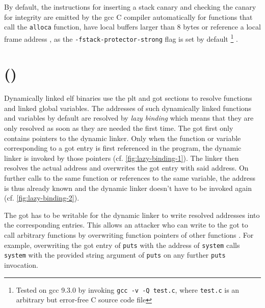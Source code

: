 By default, the instructions for inserting a stack canary and checking the canary for integrity are emitted by the \gls{gcc} C compiler automatically for functions that call the \texttt{alloca} function, have local buffers larger than 8 bytes or reference a local frame address \cite{FSF2019}, as the \texttt{-fstack-protector-strong} flag is set by default%
	\footnote{Tested on \gls{gcc} 9.3.0 by invoking \texttt{gcc -v -Q test.c}, where \texttt{test.c} is an arbitrary but error-free C source code file}%
.

\section{ ()}
\label{sec:relro}

Dynamically linked \gls{elf} binaries use the \gls{plt} and \gls{got} sections to resolve functions and linked global variables.
The addresses of such dynamically linked functions and variables by default are resolved by \emph{lazy binding} which means that they are only resolved as soon as they are needed the first time.
The \gls{got} first only contains pointers to the dynamic linker.
Only when the function or variable corresponding to a \gls{got} entry is first referenced in the program, the dynamic linker is invoked by those pointers (cf. \cref{fig:lazy-binding-1}).
The linker then resolves the actual address and overwrites the \gls{got} entry with said address.
On further calls to the same function or references to the same variable, the address is thus already known and the dynamic linker doesn't have to be invoked again \cites{Bendersky2011}[645\psqq]{Federico2015}{Sidhpurwala2019} (cf. \cref{fig:lazy-binding-2}).

The \gls{got} has to be writable for the dynamic linker to write resolved addresses into the corresponding entries.
This allows an attacker who can write to the \gls{got} to call arbitrary functions by overwriting function pointers of other functions \cite{Sidhpurwala2019}.
For example, overwriting the \gls{got} entry of \texttt{puts} with the address of \texttt{system} calls \texttt{system} with the provided string argument of \texttt{puts} on any further \texttt{puts} invocation.

